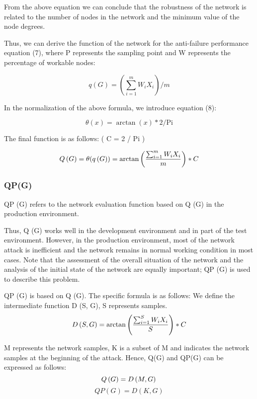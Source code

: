 \documentclass[AMA,STIX1COL]{WileyNJD-v2}
\begin{document}
\par From the above equation we can conclude that the robustness of the network is related to the number of nodes in the network and the minimum value of the node degrees.


\par Thus, we can derive the function of the network for the anti-failure performance equation (7), where P represents the sampling point and W represents the percentage of workable nodes:

\begin{equation} 
q\left ( G \right )= \left (  \sum_{i=1}^{m}W_iX_i \right )/m
\end{equation}

In the normalization of the above formula, we introduce equation (8): 

\begin{equation} 
\theta (x)=\arctan \left ( x \right )\ast 2/\mathrm{Pi}
\end{equation}

The final function is as follows: ( C = 2 / Pi )

\begin{equation} 
Q\left ( G \right )= \theta (q\left ( G \right ))=\arctan \left (  \frac{ \sum_{i=1}^{m}W_iX_i}{m}  \right )\ast C \\
\end{equation}
\subsubsection{QP(G)}
\par QP (G) refers to the network evaluation function based on Q (G) in the production environment. 
\par Thus, Q (G) works well in the development environment and in part of the test environment. However, in the production environment, most of the network attack is inefficient and the network remains in normal working condition in most cases. Note that the assessment of the overall situation of the network and the analysis of the initial state of the network are equally important; QP (G) is used to describe this problem.
\par QP (G) is based on Q (G). The specific formula is as follows: We define the intermediate function D (S, G), S represents samples. 
\begin{equation} 
D\left (S, G\right )=\arctan \left (  \frac{ \sum_{i=1}^{S}W_iX_i}{S}  \right )\ast C \\  
\end{equation}
\par M represents the network samples, K is a subset of M and indicates the network samples at the beginning of the attack. Hence, Q(G) and QP(G) can be expressed as follows:
\begin{equation} 
Q\left (G \right ) = D\left (M, G \right )\\
\end{equation}
\begin{equation} 
QP (G) = D\left (K, G \right )
\end{equation}
\end{document}
